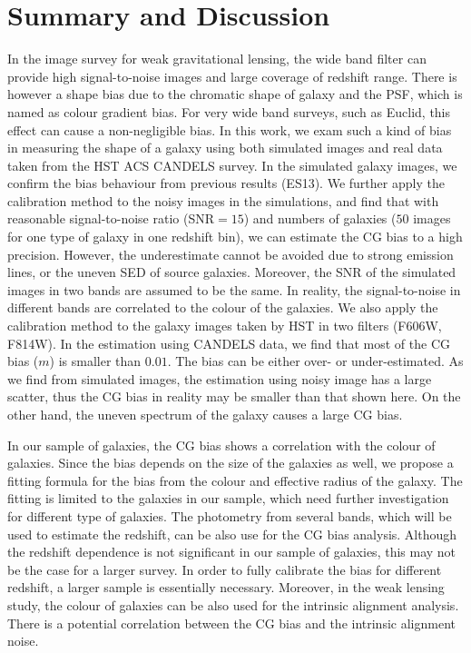 \documentclass[useAMS,usenatbib]{mn2e}
\newcommand{\be}{\begin{equation}}
\newcommand{\ee}{\end{equation}}
\begin{document}


\section{Summary and Discussion}
In the image survey for weak gravitational lensing, the wide band
filter can provide high signal-to-noise images and large coverage of
redshift range. There is however a shape bias due to the chromatic
shape of galaxy and the PSF, which is named as colour gradient
bias. For very wide band surveys, such as Euclid, this effect can
cause a non-negligible bias.
%
In this work, we exam such a kind of bias in measuring the shape of
a galaxy using both simulated images and real data taken from the HST ACS
CANDELS survey.  In the simulated galaxy images, we confirm the bias
behaviour from previous results (ES13). We further apply the calibration
method to the noisy images in the simulations, and find that with
reasonable signal-to-noise ratio (SNR$=15$) and numbers of galaxies ($50$
images for one type of galaxy in one redshift bin), we can estimate
the CG bias to a high precision. However, the underestimate cannot
be avoided due to strong emission lines, or the uneven SED of source
galaxies. Moreover, the SNR of the simulated images in two
bands are assumed to be the same. In reality, the signal-to-noise in
different bands are correlated to the colour of the galaxies.
%
We also apply the calibration method to the galaxy images taken by HST
in two filters (F606W, F814W). In the estimation using CANDELS data,
we find that most of the CG bias ($m$) is smaller than $0.01$. The
bias can be either over- or under-estimated. As we find from simulated
images, the estimation using noisy image has a large scatter, thus the
CG bias in reality may be smaller than that shown here. On the other
hand, the uneven spectrum of the galaxy causes a large CG bias.

In our sample of galaxies, the CG bias shows a correlation with the
colour of galaxies. Since the bias depends on the size of the galaxies
as well, we propose a fitting formula for the bias from the colour and
effective radius of the galaxy. The fitting is limited to the galaxies
in our sample, which need further investigation for different type of
galaxies.  The photometry from several bands, which will be used to
estimate the redshift, can be also use for the CG bias
analysis. Although the redshift dependence is not significant in our
sample of galaxies, this may not be the case for a larger
survey. In order to fully calibrate the bias for different redshift, a
larger sample is essentially necessary. Moreover, in the weak lensing
study, the colour of galaxies can be also used for the intrinsic
alignment analysis. There is a potential correlation between the CG
bias and the intrinsic alignment noise.
\end{document}
